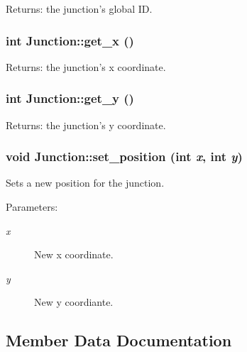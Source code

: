 \begin{Desc}
\item[Returns:]the junction's global ID.\end{Desc}
\subsubsection{\setlength{\rightskip}{0pt plus 5cm}int Junction::get\_\-x ()\hspace{0.3cm}{\tt  [inline]}}\label{classJunction_Junctiona2}


\begin{Desc}
\item[Returns:]the junction's x coordinate.\end{Desc}
\subsubsection{\setlength{\rightskip}{0pt plus 5cm}int Junction::get\_\-y ()\hspace{0.3cm}{\tt  [inline]}}\label{classJunction_Junctiona3}


\begin{Desc}
\item[Returns:]the junction's y coordinate.\end{Desc}
\subsubsection{\setlength{\rightskip}{0pt plus 5cm}void Junction::set\_\-position (int {\em x}, int {\em y})\hspace{0.3cm}{\tt  [inline]}}\label{classJunction_Junctiona4}


Sets a new position for the junction. 

\begin{Desc}
\item[Parameters:]
\begin{description}
\item[{\em x}]New x coordinate. \item[{\em y}]New y coordiante.\end{description}
\end{Desc}


\subsection{Member Data Documentation}
